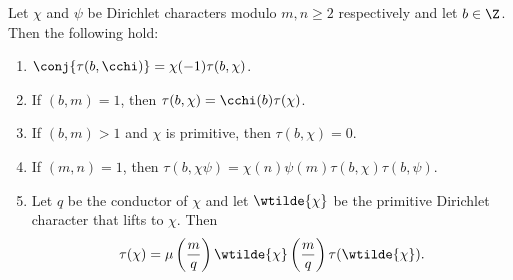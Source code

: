         \begin{proposition}\label{prop:Gauss_sum_reduction}
          Let $\chi$ and $\psi$ be Dirichlet characters modulo $m,n \ge 2$ respectively and let $b \in \Z$. Then the following hold:
          \begin{enumerate}[label=(\roman*)]
            \item $\conj{\tau(b,\cchi)} = \chi(-1)\tau(b,\chi)$.
            \item If $(b,m) = 1$, then $\tau(b,\chi) = \cchi(b)\tau(\chi)$.
            \item If $(b,m) > 1$ and $\chi$ is primitive, then $\tau(b,\chi) = 0$.
            \item If $(m,n) = 1$, then $\tau(b,\chi\psi) = \chi(n)\psi(m)\tau(b,\chi)\tau(b,\psi)$.
            \item Let $q$ be the conductor of $\chi$ and let $\wtilde{\chi}$ be the primitive Dirichlet character that lifts to $\chi$. Then
            \[
              \tau(\chi) = \mu\left(\frac{m}{q}\right)\wtilde{\chi}\left(\frac{m}{q}\right)\tau(\wtilde{\chi}).
            \]
          \end{enumerate}
        \end{proposition}
